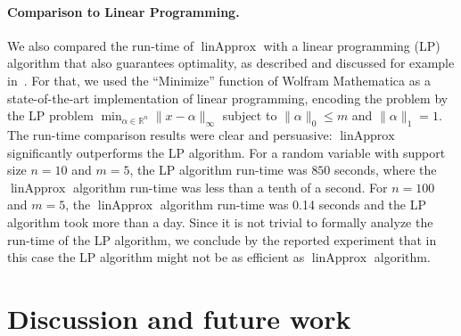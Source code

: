 \documentclass[letterpaper]{article} %
\DeclareMathOperator{\KlmApprox}{linApprox}
\begin{document}
\paragraph{Comparison to Linear Programming.}
We also compared the run-time of $\KlmApprox$ with a linear programming (LP) algorithm that also guarantees optimality, as described and discussed for example in~\cite{pavlikov2016cvar}.
For that, we used the ``Minimize'' function of Wolfram Mathematica as a  state-of-the-art implementation of linear programming, encoding the problem by the LP problem $\min_{\alpha \in \mathbb{R}^n} \| x - \alpha\|_\infty$ subject to $\|\alpha\|_0 \leq m$ and $\| \alpha \|_1 =1$.
The run-time comparison results were clear and persuasive: $\KlmApprox$ significantly outperforms the LP algorithm. For a random variable with support size $n=10$ and $m=5$, the LP algorithm run-time was $850$ seconds, where the $\KlmApprox$ algorithm run-time was less than a tenth of a second. For $n=100$ and $m=5$, the $\KlmApprox$ algorithm run-time was 0.14 seconds and the LP algorithm took more than a day. 
Since it is not trivial to formally analyze the run-time of the LP algorithm, we conclude by the reported experiment that in this case the LP algorithm might not be as efficient as $\KlmApprox$ algorithm.

\section{Discussion and future work}\label{sec:discussion}
\end{document}
